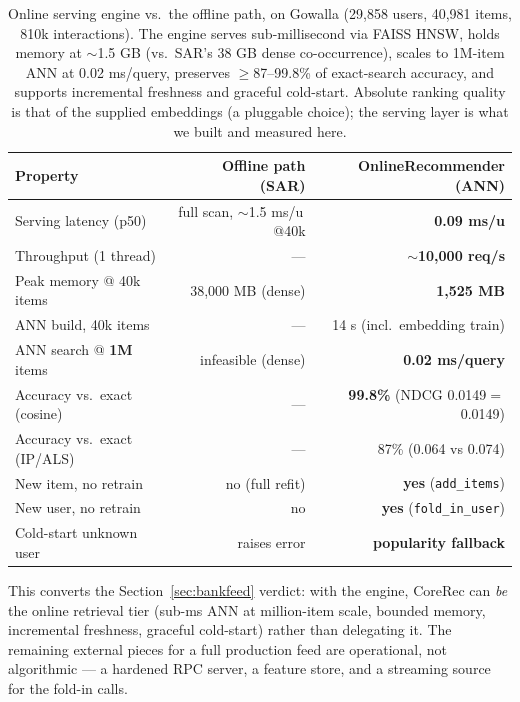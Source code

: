 \documentclass[10pt]{article}
\begin{document}
\begin{table}[h]\centering\small
\begin{tabular}{lrr}
\toprule
Property & Offline path (SAR) & OnlineRecommender (ANN) \\
\midrule
Serving latency (p50) & full scan, $\sim$1.5 ms/u\,@40k & \textbf{0.09 ms/u} \\
Throughput (1 thread) & --- & \textbf{$\sim$10{,}000 req/s} \\
Peak memory @ 40k items & 38{,}000 MB (dense) & \textbf{1{,}525 MB} \\
ANN build, 40k items & --- & 14 s (incl.\ embedding train) \\
ANN search @ \textbf{1M} items & infeasible (dense) & \textbf{0.02 ms/query} \\
Accuracy vs.\ exact (cosine) & --- & \textbf{99.8\%} (NDCG 0.0149$=$0.0149) \\
Accuracy vs.\ exact (IP/ALS) & --- & 87\% (0.064 vs 0.074) \\
New item, no retrain & no (full refit) & \textbf{yes} (\texttt{add\_items}) \\
New user, no retrain & no & \textbf{yes} (\texttt{fold\_in\_user}) \\
Cold-start unknown user & raises error & \textbf{popularity fallback} \\
\bottomrule
\end{tabular}
\caption{Online serving engine vs.\ the offline path, on Gowalla (29{,}858 users,
40{,}981 items, 810k interactions). The engine serves sub-millisecond via FAISS
HNSW, holds memory at $\sim$1.5 GB (vs.\ SAR's 38 GB dense co-occurrence), scales
to 1M-item ANN at 0.02 ms/query, preserves $\geq$87--99.8\% of exact-search
accuracy, and supports incremental freshness and graceful cold-start. Absolute
ranking quality is that of the supplied embeddings (a pluggable choice); the
serving layer is what we built and measured here.}
\label{tab:online}
\end{table}

This converts the Section~\ref{sec:bankfeed} verdict: with the engine, CoreRec can
\emph{be} the online retrieval tier (sub-ms ANN at million-item scale, bounded
memory, incremental freshness, graceful cold-start) rather than delegating it. The
remaining external pieces for a full production feed are operational, not
algorithmic --- a hardened RPC server, a feature store, and a streaming source for
the fold-in calls.
\end{document}
